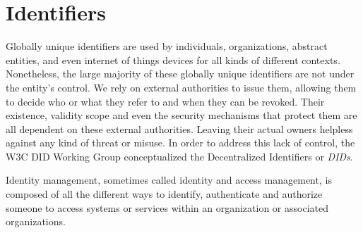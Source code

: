  
 
 
 
\section{Identifiers}

Globally unique identifiers are used by individuals, organizations, abstract entities, and even internet of things devices for all kinds of different contexts. Nonetheless, the large majority of these globally unique identifiers are not under the entity's control. We rely on external authorities to issue them, allowing them to decide who or what they refer to and when they can be revoked. Their existence, validity scope and even the security mechanisms that protect them are all dependent on these external authorities. Leaving their actual owners helpless against any kind of threat or misuse\cite{sporny_longley_sabadello_reed_steele_2021}. In order to address this lack of control, the W3C DID Working Group conceptualized the Decentralized Identifiers or \emph{DIDs}.


Identity management, sometimes called identity and access management, is composed of all the different ways to identify, authenticate and authorize someone to access systems or services within an organization or associated organizations. 

